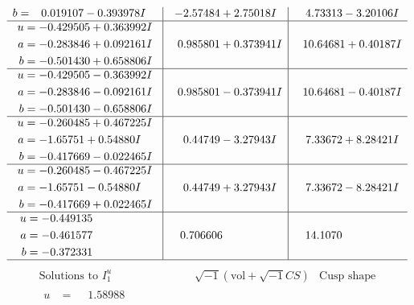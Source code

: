 \documentclass[1p]{elsarticle_modified}
\theoremstyle{definition}
\newcommand{\I}{\sqrt{-1}}
\begin{document}
$$\begin{array}{c|c|c}
\begin{aligned}
b &= \phantom{-}0.019107 - 0.393978 I\end{aligned}
 & -2.57484 + 2.75018 I & \phantom{-}4.73313 - 3.20106 I \\ \hline\begin{aligned}
u &= -0.429505 + 0.363992 I \\
a &= -0.283846 + 0.092161 I \\
b &= -0.501430 + 0.658806 I\end{aligned}
 & \phantom{-}0.985801 + 0.373941 I & \phantom{-}10.64681 + 0.40187 I \\ \hline\begin{aligned}
u &= -0.429505 - 0.363992 I \\
a &= -0.283846 - 0.092161 I \\
b &= -0.501430 - 0.658806 I\end{aligned}
 & \phantom{-}0.985801 - 0.373941 I & \phantom{-}10.64681 - 0.40187 I \\ \hline\begin{aligned}
u &= -0.260485 + 0.467225 I \\
a &= -1.65751 + 0.54880 I \\
b &= -0.417669 - 0.022465 I\end{aligned}
 & \phantom{-}0.44749 - 3.27943 I & \phantom{-}7.33672 + 8.28421 I \\ \hline\begin{aligned}
u &= -0.260485 - 0.467225 I \\
a &= -1.65751 - 0.54880 I \\
b &= -0.417669 + 0.022465 I\end{aligned}
 & \phantom{-}0.44749 + 3.27943 I & \phantom{-}7.33672 - 8.28421 I \\ \hline\begin{aligned}
u &= -0.449135\phantom{ +0.000000I} \\
a &= -0.461577\phantom{ +0.000000I} \\
b &= -0.372331\phantom{ +0.000000I}\end{aligned}
 & \phantom{-}0.706606\phantom{ +0.000000I} & \phantom{-}14.1070\phantom{ +0.000000I}\\
 \hline 
 \end{array}$$\newpage$$\begin{array}{c|c|c}  
\text{Solutions to }I^u_{1}& \I (\text{vol} + \sqrt{-1}CS) & \text{Cusp shape}\\
 \hline 
\begin{aligned}
u &= \phantom{-}1.58988\phantom{ +0.000000I} \\

\end{aligned}
\end{array}$$
\end{document}
